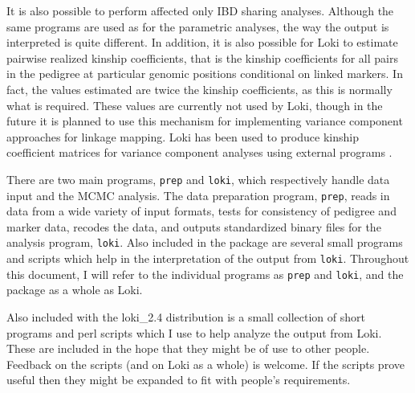 \documentclass[10pt,a4paper]{article}
\newcommand{\Prep}{\texttt{prep}\xspace}
\newcommand{\Loki}{\texttt{loki}\xspace}
\begin{document}
It is also possible to perform affected only IBD sharing analyses.  Although
the same programs are used as for the parametric analyses, the way the
output is interpreted is quite different.  In addition, it is also possible
for Loki to estimate pairwise realized kinship coefficients, that is the
kinship coefficients for all pairs in the pedigree at particular genomic
positions conditional on linked markers. In fact, the values estimated are
twice the kinship coefficients, as this is normally what is required.  These
values are currently not used by Loki, though in the future it is planned to
use this mechanism for implementing variance component approaches for
linkage mapping. Loki has been used to produce kinship coefficient matrices
for variance component analyses using external programs \cite{visscher_99}.

There are two main programs, \Prep and \Loki, which respectively handle data
input and the MCMC analysis.  The data preparation program, \Prep, reads in
data from a wide variety of input formats, tests for consistency of pedigree
and marker data, recodes the data, and outputs standardized binary files for
the analysis program, \Loki.  Also included in the package are several small
programs and scripts which help in the interpretation of the output from
\Loki.  Throughout this document, I will refer to the individual programs as
\Prep and \Loki, and the package as a whole as Loki.

Also included with the loki\_2.4 distribution is a small collection of short
programs and perl scripts which I use to help analyze the output from Loki.
These are included in the hope that they might be of use to other people.
Feedback on the scripts (and on Loki as a whole) is welcome.  If the scripts
prove useful then they might be expanded to fit with people's requirements.
\end{document}
